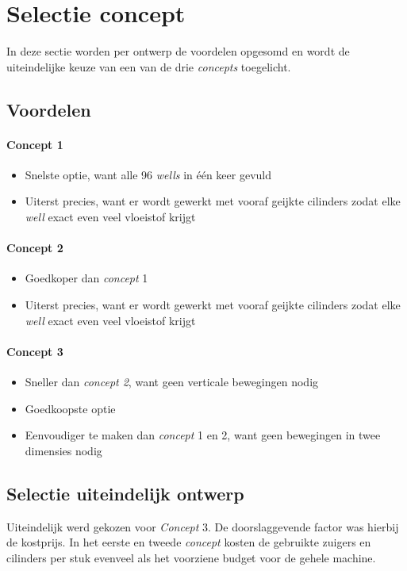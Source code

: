 \documentclass[a4paper,twoside,kulak]{kulakreport} %
\begin{document}
\section{Selectie concept}
In deze sectie worden per ontwerp de voordelen opgesomd en wordt de uiteindelijke keuze van een van de drie \textit{concepts} toegelicht.

\subsection{Voordelen}

\paragraph{Concept 1}
\begin{itemize}
	\item Snelste optie, want alle 96 \textit{wells} in één keer gevuld
	\item Uiterst precies, want er wordt gewerkt met vooraf geijkte cilinders zodat elke 	\textit{well} exact even veel vloeistof krijgt
\end{itemize}

\paragraph{Concept 2}
\begin{itemize}
	\item Goedkoper dan \textit{concept} 1
	\item Uiterst precies, want er wordt gewerkt met vooraf geijkte cilinders zodat elke 	\textit{well} exact even veel vloeistof krijgt
\end{itemize}

\paragraph{Concept 3}
\begin{itemize}
	\item Sneller dan \textit{concept 2}, want geen verticale bewegingen nodig
	\item Goedkoopste optie
	\item Eenvoudiger te maken dan \textit{concept} 1 en 2, want geen bewegingen in twee dimensies nodig
\end{itemize}

\subsection{Selectie uiteindelijk ontwerp}
Uiteindelijk werd gekozen voor \textit{Concept} 3. De doorslaggevende factor was hierbij de kostprijs. In het eerste en tweede \textit{concept} kosten de gebruikte zuigers en cilinders per stuk evenveel als het voorziene budget voor de gehele machine.
\end{document}
